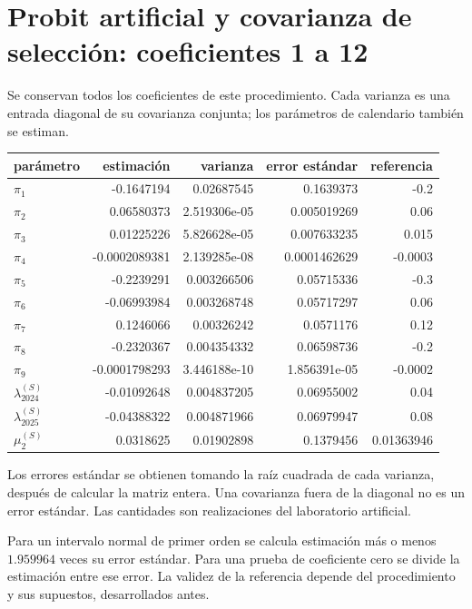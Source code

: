 \documentclass[11pt,a4paper]{article}
\begin{document}
\section{Probit artificial y covarianza de selección: coeficientes 1 a 12}
Se conservan todos los coeficientes de este procedimiento. Cada varianza es una entrada diagonal de su covarianza conjunta; los parámetros de calendario también se estiman.
\begin{center}\small
\begin{tabular}{lrrrr}
\toprule
parámetro & estimación & varianza & error estándar & referencia\\\midrule
$\pi_1$ & -0.1647194 & 0.02687545 & 0.1639373 & -0.2\\
$\pi_2$ & 0.06580373 & 2.519306e-05 & 0.005019269 & 0.06\\
$\pi_3$ & 0.01225226 & 5.826628e-05 & 0.007633235 & 0.015\\
$\pi_4$ & -0.0002089381 & 2.139285e-08 & 0.0001462629 & -0.0003\\
$\pi_5$ & -0.2239291 & 0.003266506 & 0.05715336 & -0.3\\
$\pi_6$ & -0.06993984 & 0.003268748 & 0.05717297 & 0.06\\
$\pi_7$ & 0.1246066 & 0.00326242 & 0.0571176 & 0.12\\
$\pi_8$ & -0.2320367 & 0.004354332 & 0.06598736 & -0.2\\
$\pi_9$ & -0.0001798293 & 3.446188e-10 & 1.856391e-05 & -0.0002\\
$\lambda_{2024}^{(S)}$ & -0.01092648 & 0.004837205 & 0.06955002 & 0.04\\
$\lambda_{2025}^{(S)}$ & -0.04388322 & 0.004871966 & 0.06979947 & 0.08\\
$\mu_2^{(S)}$ & 0.0318625 & 0.01902898 & 0.1379456 & 0.01363946\\
\bottomrule
\end{tabular}\end{center}

Los errores estándar se obtienen tomando la raíz cuadrada de cada varianza, después de calcular la matriz entera. Una covarianza fuera de la diagonal no es un error estándar. Las cantidades son realizaciones del laboratorio artificial.

Para un intervalo normal de primer orden se calcula estimación más o menos $1.959964$ veces su error estándar. Para una prueba de coeficiente cero se divide la estimación entre ese error. La validez de la referencia depende del procedimiento y sus supuestos, desarrollados antes.
\end{document}
